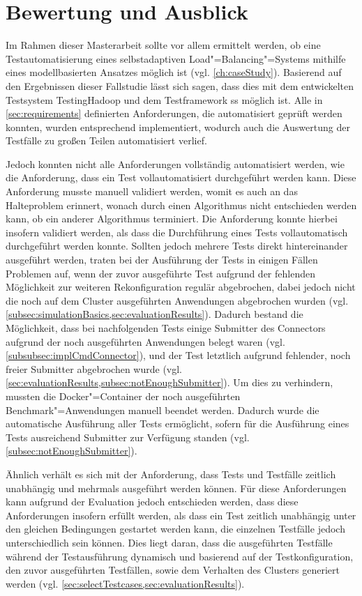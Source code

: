 \section{Bewertung und Ausblick}
\label{sec:outlook}

Im Rahmen dieser Masterarbeit sollte vor allem ermittelt werden, ob eine Testautomatisierung eines selbstadaptiven Load"=Balancing"=Systems mithilfe eines modellbasierten Ansatzes möglich ist (vgl. \cref{ch:caseStudy}).
Basierend auf den Ergebnissen dieser Fallstudie lässt sich sagen, dass dies mit dem entwickelten Testsystem TestingHadoop und dem Testframework \gls{ss} möglich ist.
Alle in \cref{sec:requirements} definierten Anforderungen, die automatisiert geprüft werden konnten, wurden entsprechend implementiert, wodurch auch die Auswertung der Testfälle zu großen Teilen automatisiert verlief.

Jedoch konnten nicht alle Anforderungen vollständig automatisiert werden, wie \zB die Anforderung, dass ein Test vollautomatisiert durchgeführt werden kann.
Diese Anforderung musste manuell validiert werden, womit es auch an das Halteproblem \cite{Turing1937,Turing1938} erinnert, wonach durch einen Algorithmus nicht entschieden werden kann, ob ein anderer Algorithmus terminiert.
Die Anforderung konnte hierbei insofern validiert werden, als dass die Durchführung eines Tests vollautomatisch durchgeführt werden konnte.
Sollten jedoch mehrere Tests direkt hintereinander ausgeführt werden, traten bei der Ausführung der Tests in einigen Fällen Problemen auf, wenn der zuvor ausgeführte Test aufgrund der fehlenden Möglichkeit zur weiteren Rekonfiguration regulär abgebrochen, dabei jedoch nicht die noch auf dem Cluster ausgeführten Anwendungen abgebrochen wurden (vgl. \cref{subsec:simulationBasics,sec:evaluationResults}).
Dadurch bestand die Möglichkeit, dass bei nachfolgenden Tests einige Submitter des Connectors aufgrund der noch ausgeführten Anwendungen belegt waren (vgl. \cref{subsubsec:implCmdConnector}), und der Test letztlich aufgrund fehlender, noch freier Submitter abgebrochen wurde (vgl. \cref{sec:evaluationResults,subsec:notEnoughSubmitter}).
Um dies zu verhindern, mussten die Docker"=Container der noch ausgeführten Benchmark"=Anwendungen manuell beendet werden.
Dadurch wurde die automatische Ausführung aller Tests ermöglicht, sofern für die Ausführung eines Tests ausreichend Submitter zur Verfügung standen (vgl. \cref{subsec:notEnoughSubmitter}).

Ähnlich verhält es sich mit der Anforderung, dass Tests und Testfälle zeitlich unabhängig und mehrmals ausgeführt werden können.
Für diese Anforderungen kann aufgrund der Evaluation jedoch entschieden werden, dass diese Anforderungen insofern erfüllt werden, als dass ein Test zeitlich unabhängig unter den gleichen Bedingungen gestartet werden kann, die einzelnen Testfälle jedoch unterschiedlich sein können.
Dies liegt daran, dass die ausgeführten Testfälle während der Testausführung dynamisch und basierend auf der Testkonfiguration, den zuvor ausgeführten Testfällen, sowie dem Verhalten des Clusters generiert werden (vgl. \cref{sec:selectTestcases,sec:evaluationResults}).

